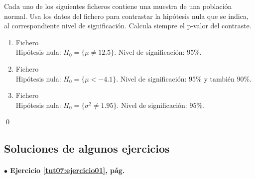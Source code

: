 \documentclass[10pt,a4paper]{article}\usepackage[]{graphicx}\usepackage[]{color}
\newcounter {cont01}
\begin{document}
\begin{ejercicio}
\label{tut06:ejercicio16}

Cada uno de los siguientes ficheros contiene una muestra de una población normal. Usa los datos del fichero para contrastar la hipótesis nula que se indica, al correspondiente nivel de significación. Calcula siempre el p-valor del contraste.

\begin{enumerate}



  \item

  Fichero \\
  Hipótesis nula: $H_0=\{\mu\neq12.5\}$.
  Nivel de significación: $95\%$.



  \item

  Fichero \\
  Hipótesis nula: $H_0=\{\mu < \ensuremath{-4.1}\}$.
  Nivel de significación: $95\%$ y también $90\%$.



  \item

  Fichero \\
  Hipótesis nula: $H_0=\{\sigma^2 \neq 1.95\}$.
  Nivel de significación: $95\%$.



\end{enumerate}

\qed
\end{ejercicio}



\subsection*{Soluciones de algunos ejercicios}
\label{tut07:subsec:SolucionesAlgunosEjercicios}


\paragraph{\bf $\bullet$ Ejercicio \ref{tut07:ejercicio01}, pág. \pageref{tut07:ejercicio01}}
\label{tut07:ejercicio01:sol}\quad\\
\end{document}
